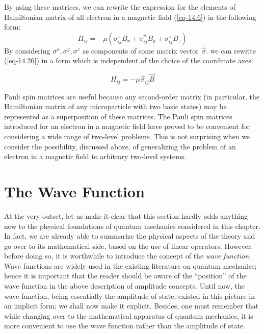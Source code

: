 \documentclass[a4paper,sfsidenotes,colorlinks=true]{tufte-book}
\numberwithin{equation}{section}
\numberwithin{figure}{section}
\begin{document}
{\small By using these matrices, we can rewrite the expression
for the elements of Hamiltonian matrix of all electron in a magnetic
fiald (\ref{eq-14.6}) in the following form: }
\begin{equation}%
H_{ij} = - \mu \left( \sigma^{x}_{ij}B_{x} + \sigma^{y}_{ij}B_{y}
  +\sigma^{z}_{ij}B_{z} \right)
\label{eq-14.26}
\end{equation}
{\small By considering $\sigma^{x}, \sigma^{y}, \sigma^{z}$ as components of
  some matrix vector $\vec{\sigma}$. we can rewrite (\ref{eq-14.26}) in a form which is independent of the choice of the coordinate axes: }

\begin{equation}%
H_{ij} = - \mu \vec{\sigma}_{ij} \vec{B}
\label{eq-14.27}
\end{equation}

{\small Pauli spin matrices are useful because any second-order
  matrix (in particular, the Hamiltonian matrix of any microparticle
  with two basic states) may be represented as a superposition of
  these matrices. The Pauli spin matrices introduced for an electron
  in a magnetic field have proved to be convenient for considering a
  wide range of two-level problems. This is not surprising when we
  consider the possibility, discussed above, of generalizing the
  problem of an electron in a magnetic field to arbitrary two-level
  systems.  }

\section{The Wave Function}
\label{sec-15}
At the very outset, let us make it clear that this section hardly adds
anything new to the physical foundations of quantum mechanics
considered in this chapter. In fact, we are already able to summarize
the physical aspects of the theory and go over to its mathematical
side, based on the use of linear operators. However, before doing so,
it is worthwhile to introduce the concept of the \emph{wave
  function}. Wave functions are widely used in the existing literature
on quantum mechanics; hence it is important that the reader should be
aware of the ``position'' of the wave function in the above description
of amplitude concepts. Until now, the wave function, being essentially
the amplitude of state, existed in this picture in an implicit form;
we shall now make it explicit. Besides, one must remember that while
changing over to the mathematical apparatus of quantum mechanics, it
is more convenient to use the wave function rather than the amplitude
of state.  
\end{document}
